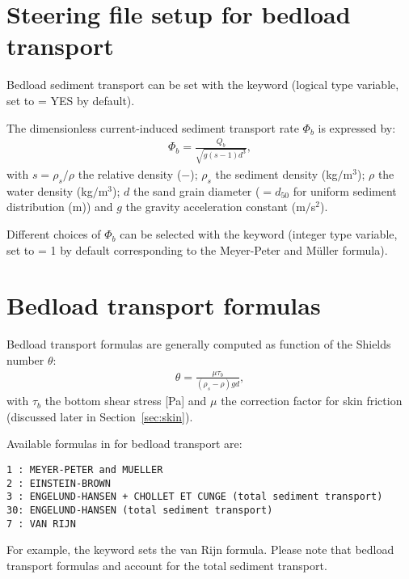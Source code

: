 \section{Steering file setup for bedload transport}
Bedload sediment transport can be set with the keyword  (logical type variable, set to {\ttfamily = YES} by default).

The dimensionless current-induced sediment transport rate $\Phi_b$ is expressed by:
\begin{align}
\Phi_b = \frac{Q_b}{\sqrt{g(s-1)d^3}},
\label{eq:Phis}
\end{align}
with $s=\rho_s/\rho$ the relative density ($-$); $\rho_s$ the sediment density (kg$/$m$^3$); $\rho$ the water density (kg$/$m$^3$); $d$ the sand grain diameter ($=d_{50}$ for uniform sediment distribution (m)) and $g$ the gravity acceleration constant (m$/$s$^2$).

Different choices of $\Phi_b$ can be selected with the keyword  (integer type variable, set to {\ttfamily = 1} by default corresponding to the Meyer-Peter and M\"uller formula).

\section{Bedload transport formulas}
Bedload transport formulas are generally computed as function of the Shields number $\theta$:
\begin{align}
\theta=\frac{\mu\tau_b}{(\rho_s-\rho)gd}, 
\label{eq:shieldsp}
\end{align}
with $\tau_b$ the bottom shear stress [Pa] and $\mu$ the correction factor for skin friction (discussed later in Section~\ref{sec:skin}).

Available formulas in \sisyphe{} for bedload transport are:
\begin{lstlisting}[frame=trBL]
1 : MEYER-PETER and MUELLER
2 : EINSTEIN-BROWN 
3 : ENGELUND-HANSEN + CHOLLET ET CUNGE (total sediment transport)
30: ENGELUND-HANSEN (total sediment transport)
7 : VAN RIJN 
\end{lstlisting}
For example, the keyword  sets the van Rijn formula. Please note that bedload transport formulas  and  account for the total sediment transport.

